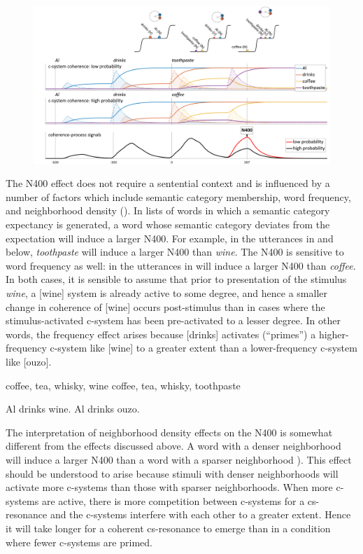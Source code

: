   
\begin{figure}
\includegraphics[width=\textwidth]{figures/Tilsen-img143.png}
\caption{\missingcaption}
\label{fig:}
\end{figure}
 

The N400 effect does not require a sentential context and is influenced by a number of factors which include semantic category membership, word frequency, and neighborhood density (\citealt{KutasFedermeier2011,LauEtAl2008}). In lists of words in which a semantic category expectancy is generated, a word whose semantic category deviates from the expectation will induce a larger N400. For example, in the utterances in  and  below, \textit{toothpaste} will induce a larger N400 than \textit{wine}. The N400 is sensitive to word frequency as well: in the utterances in  will induce a larger N400 than \textit{coffee}. In both cases, it is sensible to assume that prior to presentation of the stimulus \textit{wine}, a [wine] system is already active to some degree, and hence a smaller change in coherence of [wine] occurs post-stimulus than in cases where the stimulus-activated c-system has been pre-activated to a lesser degree. In other words, the frequency effect arises because [drinks] activates (“primes”) a higher-frequency c-system like [wine] to a greater extent than a lower-frequency c-system like [ouzo].

\ea
\ea coffee, tea, whisky, wine
\ex  coffee, tea, whisky, toothpaste
\z
\z

\ea
\ea Al drinks wine.
\ex Al drinks ouzo.
\z
\z

  The interpretation of neighborhood density effects on the N400 is somewhat different from the effects discussed above. A word with a denser neighborhood will induce a larger N400 than a word with a sparser neighborhood \citep{HolcombEtAl2002,MüllerEtAl2010}). This effect should be understood to arise because stimuli with denser neighborhoods will activate more c-systems than those with sparser neighborhoods. When more c-systems are active, there is more competition between c-systems for a cs-resonance and the c-systems interfere with each other to a greater extent. Hence it will take longer for a coherent cs-resonance to emerge than in a condition where fewer c-systems are primed. 

